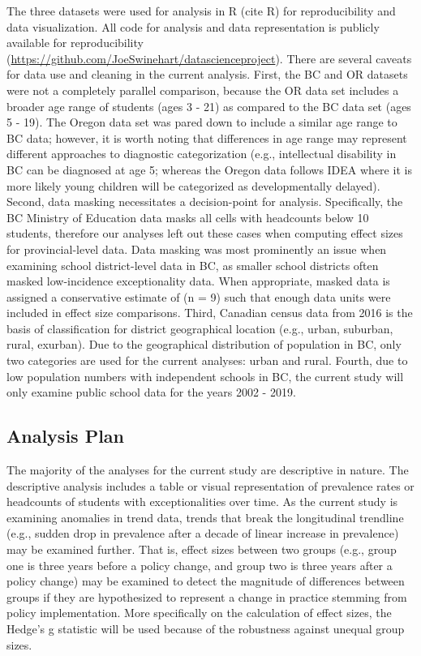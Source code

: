 \documentclass[
  english,
  man]{apa6}
\begin{document}
The three datasets were used for analysis in R (cite R) for reproducibility and data visualization. All code for analysis and data representation is publicly available for reproducibility (\url{https://github.com/JoeSwinehart/datascienceproject}). There are several caveats for data use and cleaning in the current analysis. First, the BC and OR datasets were not a completely parallel comparison, because the OR data set includes a broader age range of students (ages 3 - 21) as compared to the BC data set (ages 5 - 19). The Oregon data set was pared down to include a similar age range to BC data; however, it is worth noting that differences in age range may represent different approaches to diagnostic categorization (e.g., intellectual disability in BC can be diagnosed at age 5; whereas the Oregon data follows IDEA where it is more likely young children will be categorized as developmentally delayed). Second, data masking necessitates a decision-point for analysis. Specifically, the BC Ministry of Education data masks all cells with headcounts below 10 students, therefore our analyses left out these cases when computing effect sizes for provincial-level data. Data masking was most prominently an issue when examining school district-level data in BC, as smaller school districts often masked low-incidence exceptionality data. When appropriate, masked data is assigned a conservative estimate of (n = 9) such that enough data units were included in effect size comparisons. Third, Canadian census data from 2016 is the basis of classification for district geographical location (e.g., urban, suburban, rural, exurban). Due to the geographical distribution of population in BC, only two categories are used for the current analyses: urban and rural. Fourth, due to low population numbers with independent schools in BC, the current study will only examine public school data for the years 2002 - 2019.

\hypertarget{analysis-plan}{%
\subsection{Analysis Plan}\label{analysis-plan}}

The majority of the analyses for the current study are descriptive in nature. The descriptive analysis includes a table or visual representation of prevalence rates or headcounts of students with exceptionalities over time. As the current study is examining anomalies in trend data, trends that break the longitudinal trendline (e.g., sudden drop in prevalence after a decade of linear increase in prevalence) may be examined further. That is, effect sizes between two groups (e.g., group one is three years before a policy change, and group two is three years after a policy change) may be examined to detect the magnitude of differences between groups if they are hypothesized to represent a change in practice stemming from policy implementation. More specifically on the calculation of effect sizes, the Hedge's g statistic will be used because of the robustness against unequal group sizes.
\end{document}
